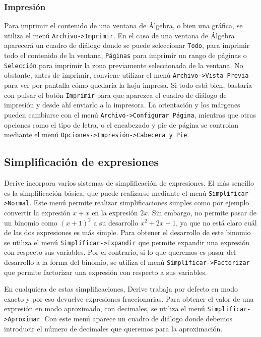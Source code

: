 \subsubsection*{Impresión}
Para imprimir el contenido de una ventana de Álgebra, o bien una
gráfica, se utiliza el menú \texttt{Archivo->Imprimir}. En el caso
de una ventana de Álgebra aparecerá un cuadro de diálogo donde se
puede seleccionar \texttt{Todo}, para imprimir todo el contenido de
la ventana, \texttt{Páginas} para imprimir un rango de páginas o
\texttt{Selección} para imprimir la zona previamente seleccionada de
la ventana. No obstante, antes de imprimir, conviene utilizar el
menú \texttt{Archivo->Vista Previa} para ver por pantalla cómo
quedaría la hoja impresa. Si todo está bien, bastaría con pulsar el
botón \texttt{Imprimir} para que aparezca el cuadro de diálogo de
impresión y desde ahí enviarlo a la impresora. La orientación y los
márgenes pueden cambiarse con el menú \texttt{Archivo->Configurar
Página}, mientras que otras opciones como el tipo de letra, o el
encabezado y pie de página se controlan mediante el menú
\texttt{Opciones->Impresión->Cabecera y Pie}.

\subsection*{Simplificación de expresiones}
Derive incorpora varios sistemas de simplificación de expresiones.
El más sencillo es la simplificación básica, que puede realizarse
mediante el menú \texttt{Simplificar->Normal}. Este menú permite
realizar simplificaciones simples como por ejemplo convertir la
expresión $x+x$ en la expresión $2x$. Sin embargo, no permite pasar
de un binomio como $(x+1)^2$ a su desarrollo $x^2+2x+1$, ya que no
está claro cuál de las dos expresiones es más simple. Para obtener
el desarrollo de este binomio se utiliza el menú
\texttt{Simplificar->Expandir} que permite expandir una expresión
con respecto sus variables. Por el contrario, si lo que queremos es
pasar del desarrollo a la forma del binomio, se utiliza el menú
\texttt{Simplificar->Factorizar} que permite factorizar una
expresión con respecto a sus variables.

En cualquiera de estas simplificaciones, Derive trabaja por defecto
en modo exacto y por eso devuelve expresiones fraccionarias. Para
obtener el valor de una expresión en modo aproximado, con decimales,
se utiliza el menú \texttt{Simplificar->Aproximar}. Con este menú
aparece un cuadro de diálogo donde debemos introducir el número de
decimales que queremos para la aproximación.

